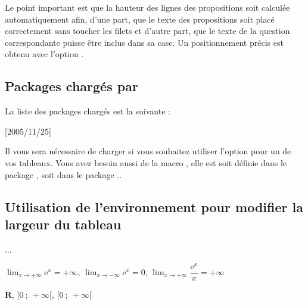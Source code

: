 Le point important est que la hauteur des lignes des propositions soit calculée automatiquement afin, d'une part, que le texte des propositions soit placé correctement sans toucher les filets et d'autre part, que le texte de la question correspondante puisse être inclus dans sa case. Un positionnement précis est obtenu avec l'option .  

\subsection{Packages chargés par }
La liste des packages chargés est la suivante :

\begin{tkzexample}
	\RequirePackage{xkeyval}[2005/11/25]
	\RequirePackage{calc}
	\RequirePackage{ifthen,forloop}
	\RequirePackage{array}
	\RequirePackage{multirow}
	\RequirePackage{pifont}
\end{tkzexample}

Il vous sera nécessaire de charger  si vous souhaitez utiliser l'option  pour un de vos tableaux. Vous avez besoin aussi de la macro , elle est soit définie dans le package , soit dans le package ..


 \subsection{Utilisation de l'environnement  pour modifier la largeur du tableau}

\begin{minipage}[c][][t]{.3\linewidth}
\begin{tkzltxexample}[small]

 \begin{center}
 \begin{minipage}{9cm}
  \begin{alterqcm}[lq=5cm]
    ...
  \end{alterqcm}
 \end{minipage}
 \end{center}
\end{tkzltxexample}
\end{minipage}\hfill 
\begin{minipage}[c][][t]{.6\linewidth}
\begin{alterqcm}[lq=5cm]
{%
{$\displaystyle\lim_{x \to +\infty} \text{e}^x = + \infty$},%
{$\displaystyle\lim_{x \to -\infty} \text{e}^x = 0$},%
{$\displaystyle\lim_{x \to +\infty} \dfrac{\text{e}^x}{x} = + \infty$}%
}

{%
{$\mathbf{R}$},%
{$\big]0~;~+ \infty\big[$},%
{$\big[0~;~+\infty\big[$}%
}\end{alterqcm}
\end{minipage} 
% 


